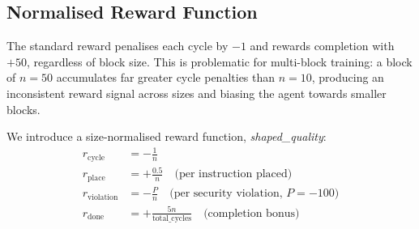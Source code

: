\documentclass[letterpaper]{article}
\begin{document}
\subsection*{Normalised Reward Function}

The standard reward penalises each cycle by $-1$ and rewards
completion with $+50$, regardless of block size. This is
problematic for multi-block training: a block of $n=50$
accumulates far greater cycle penalties than $n=10$, producing
an inconsistent reward signal across sizes and biasing the
agent towards smaller blocks.

We introduce a size-normalised reward function,
\textit{shaped\_quality}:
\begin{align}
  r_{\text{cycle}}     & = -\frac{1}{n}                                                          \\
  r_{\text{place}}     & = +\frac{0.5}{n} \quad \text{(per instruction placed)}                  \\
  r_{\text{violation}} & = -\frac{P}{n}  \quad \text{(per security violation, } P = -100\text{)} \\
  r_{\text{done}}      & = +\frac{5n}{\text{total\_cycles}} \quad \text{(completion bonus)}
\end{align}
\end{document}
